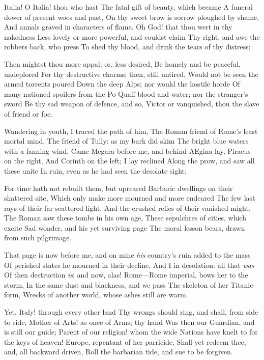 \documentclass[10pt,twocolumn]{book}
\begin{document}
   Italia!  O Italia! thou who hast
   The fatal gift of beauty, which became
   A funeral dower of present woes and past,
   On thy sweet brow is sorrow ploughed by shame,
   And annals graved in characters of flame.
   Oh God! that thou wert in thy nakedness
   Less lovely or more powerful, and couldst claim
   Thy right, and awe the robbers back, who press
To shed thy blood, and drink the tears of thy distress;


   Then mightst thou more appal; or, less desired,
   Be homely and be peaceful, undeplored
   For thy destructive charms; then, still untired,
   Would not be seen the armed torrents poured
   Down the deep Alps; nor would the hostile horde
   Of many-nationed spoilers from the Po
   Quaff blood and water; nor the stranger's sword
   Be thy sad weapon of defence, and so,
Victor or vanquished, thou the slave of friend or foe.


   Wandering in youth, I traced the path of him,
   The Roman friend of Rome's least mortal mind,
   The friend of Tully:  as my bark did skim
   The bright blue waters with a fanning wind,
   Came Megara before me, and behind
   AEgina lay, Piraeus on the right,
   And Corinth on the left; I lay reclined
   Along the prow, and saw all these unite
In ruin, even as he had seen the desolate sight;


   For time hath not rebuilt them, but upreared
   Barbaric dwellings on their shattered site,
   Which only make more mourned and more endeared
   The few last rays of their far-scattered light,
   And the crushed relics of their vanished might.
   The Roman saw these tombs in his own age,
   These sepulchres of cities, which excite
   Sad wonder, and his yet surviving page
The moral lesson bears, drawn from such pilgrimage.


   That page is now before me, and on mine
   \textit{his} country's ruin added to the mass
   Of perished states he mourned in their decline,
   And I in desolation:  all that \textit{was}
   Of then destruction \textit{is}; and now, alas!
   Rome---Rome imperial, bows her to the storm,
   In the same dust and blackness, and we pass
   The skeleton of her Titanic form,
Wrecks of another world, whose ashes still are warm.


   Yet, Italy! through every other land
   Thy wrongs should ring, and shall, from side to side;
   Mother of Arts! as once of Arms; thy hand
   Was then our Guardian, and is still our guide;
   Parent of our religion! whom the wide
   Nations have knelt to for the keys of heaven!
   Europe, repentant of her parricide,
   Shall yet redeem thee, and, all backward driven,
Roll the barbarian tide, and sue to be forgiven.
\end{document}
